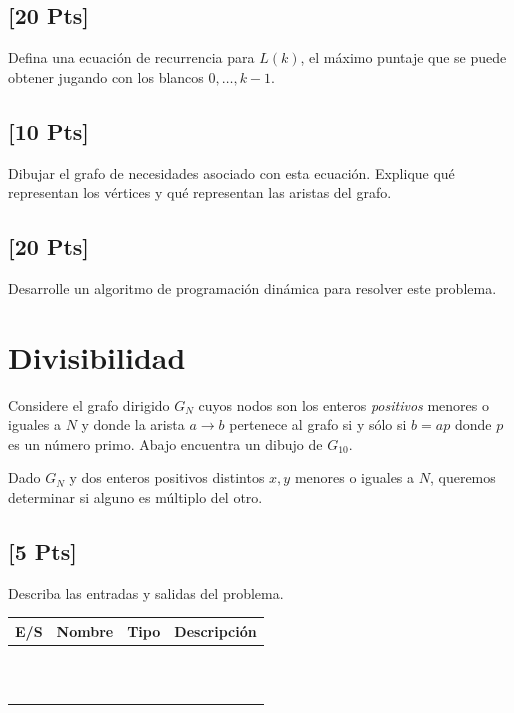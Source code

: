 \subsection{[20 Pts]} Defina una ecuación de recurrencia para $L(k)$, el máximo
puntaje que se puede obtener jugando con los blancos $0, \ldots, k-1$.

\subsection{[10 Pts]} Dibujar el grafo de necesidades asociado con esta ecuación.
Explique qué representan los vértices y qué representan las aristas del grafo.

\subsection{[20 Pts]} Desarrolle un algoritmo de programación dinámica para
resolver este problema.

\newpage
\section{Divisibilidad}
Considere el grafo dirigido $G_N$ cuyos nodos son los enteros \emph{positivos}
menores o iguales a $N$ y donde la arista $a \to b$ pertenece al grafo si y sólo
si $b= ap$ donde $p$ es un número primo. Abajo encuentra un dibujo de $G_{10}$.


Dado $G_N$ y dos enteros positivos distintos $x, y$ menores o iguales a $N$,
queremos determinar si alguno es múltiplo del otro.

\subsection{[5 Pts]} Describa las entradas y salidas del problema.

\begin{tabular}{|| l| l| l| l||}
	\hline
	{\bf E/S} & {\bf Nombre} & {\bf Tipo} & {\bf Descripción}\\
	\hline
	        \hspace{1cm} & \hspace{3cm} & \hspace{2cm} & \hspace{4cm} \\
	          &          &          & \\
	          &          &          & \\
	          &          &          & \\
	          &          &          & \\
	          &          &          & \\
	          &          &          & \\
	          &          &          & \\
	          &          &          & \\
	          &          &          & \\
	          &          &          & \\
		  \hline
\end{tabular}

